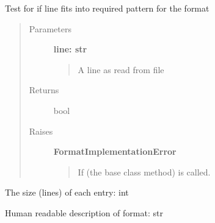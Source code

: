 \documentclass[letterpaper,10pt,english]{sphinxmanual}
\begin{document}
\begin{fulllineitems}

\begin{fulllineitems}
\label{fseq.reading:fseq.reading.seq_encoder.FastaSingleline.QUALITY_LINE}
\end{fulllineitems}


\begin{fulllineitems}
\label{fseq.reading:fseq.reading.seq_encoder.FastaSingleline.SEQUENCE_LINE}
\end{fulllineitems}


\begin{fulllineitems}
\label{fseq.reading:fseq.reading.seq_encoder.FastaSingleline.expects}
Test for if line fits into required pattern for the format
\begin{quote}\begin{description}
\item[{Parameters}] \leavevmode
\textbf{line: str}
\begin{quote}

A line as read from file
\end{quote}

\item[{Returns}] \leavevmode
bool

\item[{Raises}] \leavevmode
\textbf{FormatImplementationError}
\begin{quote}

If  (the base class method) is called.
\end{quote}

\end{description}\end{quote}

\end{fulllineitems}


\begin{fulllineitems}
\label{fseq.reading:fseq.reading.seq_encoder.FastaSingleline.itemSize}
The size (lines) of each entry: int

\end{fulllineitems}


\begin{fulllineitems}
\label{fseq.reading:fseq.reading.seq_encoder.FastaSingleline.name}
Human readable description of format: str

\end{fulllineitems}


\end{fulllineitems}
\end{document}
